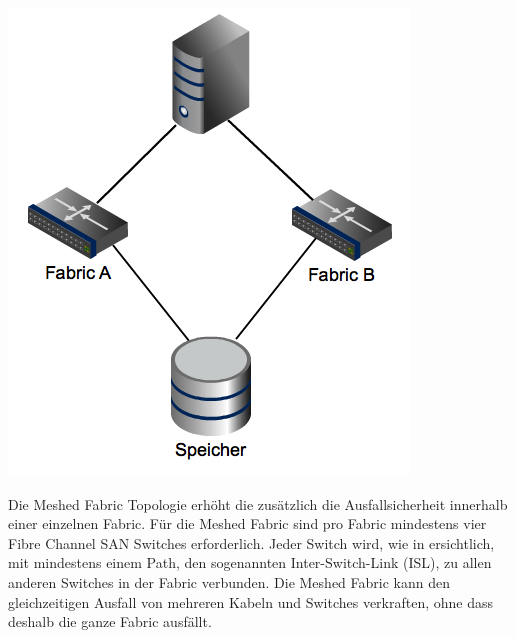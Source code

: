 \begin{center}
\includegraphics[width=\linewidth, keepaspectratio = true]{media/dualSwitchTopologie.png}
\end{center}

Die Meshed Fabric Topologie erhöht die zusätzlich die Ausfallsicherheit innerhalb einer einzelnen Fabric. Für die Meshed Fabric sind pro Fabric mindestens vier Fibre Channel SAN Switches erforderlich. Jeder Switch wird, wie in  ersichtlich, mit mindestens einem Path, den sogenannten Inter-Switch-Link (ISL), zu allen anderen Switches in der Fabric verbunden. Die Meshed Fabric kann den gleichzeitigen Ausfall von mehreren Kabeln und Switches verkraften, ohne dass deshalb die ganze Fabric ausfällt. \cite{Christopher2009}

